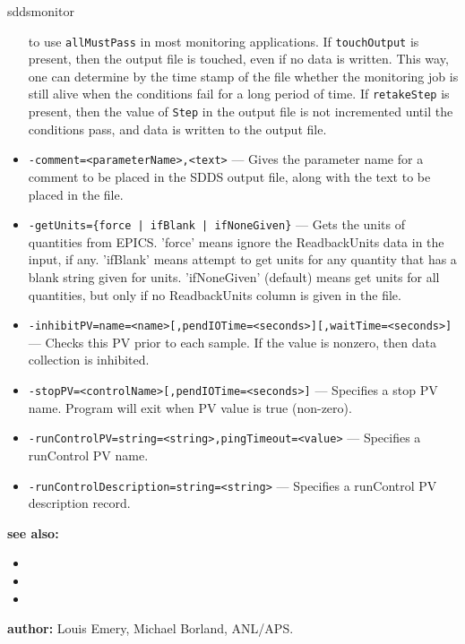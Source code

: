 \begin{sddsprog}{sddsmonitor}
\begin{itemize}
                to use \verb+allMustPass+ in most monitoring applications.
                If \verb+touchOutput+ is present, then the output file is touched, even if no data
                is written. This way, one can determine by the time stamp of the file
                whether the monitoring job is still alive
                when the conditions fail for a long period of time. If \verb+retakeStep+ is
                present, then the value of \verb+Step+ in the output file is not
                incremented until the conditions pass, and data is written to the output file.
  \item {\verb+-comment=<parameterName>,<text>+} ---
                Gives the parameter name for a comment to be placed in the SDDS output file,
                along with the text to be placed in the file.
  \item {\verb+-getUnits={force | ifBlank | ifNoneGiven}+} ---
                Gets the units of quantities from EPICS. 'force' means ignore the ReadbackUnits
                data in the input, if any. 'ifBlank' means attempt to get units for any quantity
                that has a blank string given for units. 'ifNoneGiven' (default) means get units
                for all quantities, but only if no ReadbackUnits column is given in the file.
  \item {\tt -inhibitPV=name=<name>[,pendIOTime=<seconds>][,waitTime=<seconds>]} ---
                Checks this PV prior to each sample. If the value is nonzero, then data
                collection is inhibited.
  \item {\tt -stopPV=<controlName>[,pendIOTime=<seconds>]} --- Specifies a stop PV name.
                Program will exit when PV value is true (non-zero).
  \item {\tt -runControlPV=string=<string>,pingTimeout=<value>} --- Specifies a runControl PV name.
  \item {\tt -runControlDescription=string=<string>} --- Specifies a runControl PV description record.
\end{itemize}

\item \textbf{see also:}
\begin{itemize}
  \item {}
  \item {}
  \item {}
\end{itemize}
\item \textbf{author:} Louis Emery, Michael Borland, ANL/APS.
\end{sddsprog}
